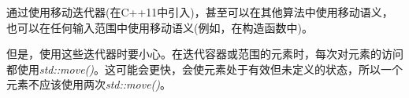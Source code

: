通过使用移动迭代器(在C++11中引入)，甚至可以在其他算法中使用移动语义，也可以在任何输入范围中使用移动语义(例如，在构造函数中)。

但是，使用这些迭代器时要小心。在迭代容器或范围的元素时，每次对元素的访问都使用\textit{std::move()}。这可能会更快，会使元素处于有效但未定义的状态，所以一个元素不应该使用两次\textit{std::move()}。
































































